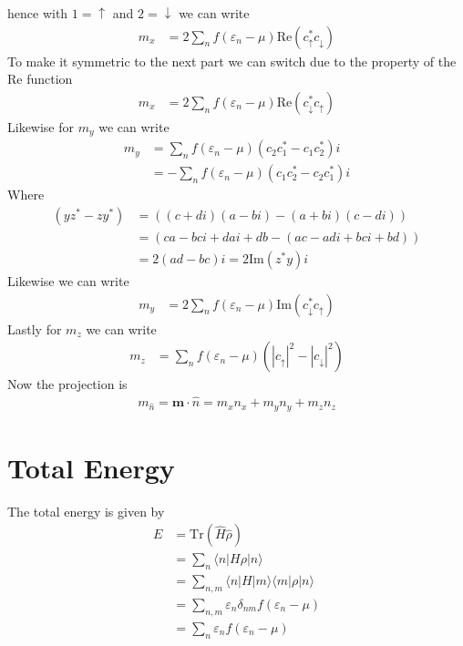 \documentclass[11pt]{article}
\begin{document}
hence with $1=\uparrow$ and $2=\downarrow$ we can write
\begin{align}
    m_x &= 2\sum_n f(\varepsilon_n - \mu) \text{Re}(c_\uparrow^* c_\downarrow)
\end{align}
To make it symmetric to the next part we can switch due to the property of the Re function
\begin{align}
    m_x &= 2\sum_n f(\varepsilon_n - \mu) \text{Re}(c_\downarrow^* c_\uparrow)
\end{align}
Likewise for $m_y$ we can write
\begin{align}
    m_y &= \sum_n f(\varepsilon_n - \mu) (c_2 c_1^* - c_1c_2^*) i \\\nonumber
    &= -\sum_n f(\varepsilon_n - \mu) (c_1 c_2^* - c_2c_1^*) i
\end{align}
Where
\begin{align}
   (yz^* - zy^*) &= ((c+di)(a-bi) - (a+bi)(c-di)) \\\nonumber
    &= (ca - bci + dai + db - (ac - adi + bci + bd)) \\\nonumber
    &= 2(ad - bc)i = 2\text{Im}(z^*y)i
\end{align}
Likewise we can write
\begin{align}
    m_y &= 2\sum_n f(\varepsilon_n - \mu) \text{Im}(c_\downarrow^* c_\uparrow)
\end{align}
Lastly for $m_z$ we can write
\begin{align}
    m_z &= \sum_n f(\varepsilon_n - \mu) (|c_\uparrow|^2 - |c_\downarrow|^2)
\end{align}
Now the projection is
\begin{gather}
    m_{\hat n} = \bm m \cdot \hat n = m_x n_x + m_y n_y + m_z n_z
\end{gather}
\section{Total Energy}
The total energy is given by
\begin{align}
    E &= \text{Tr}(\hat H \hat \rho) \\
    &= \sum_n \langle n | H \rho | n \rangle \\\nonumber
    &= \sum_{n,m} \langle n | H | m \rangle \langle m | \rho | n \rangle \\\nonumber
    &= \sum_{n,m} \varepsilon_n \delta_{nm} f(\varepsilon_n - \mu) \\\nonumber
    &= \sum_n \varepsilon_n f(\varepsilon_n - \mu)
\end{align}
\end{document}
